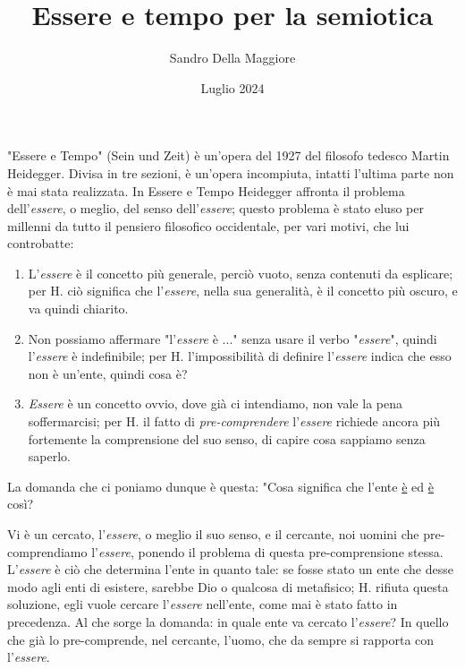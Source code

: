 \documentclass[a4paper,12pt,oneside]{article}%
\begin{document}
	\author{Sandro Della Maggiore}
	\title{Essere e tempo per la semiotica}
	\date{Luglio 2024}
	
	\maketitle


"Essere e Tempo" (Sein und Zeit) è un’opera del 1927 del filosofo tedesco Martin Heidegger. Divisa in tre sezioni, è un’opera incompiuta, intatti l’ultima parte non è mai stata realizzata. In Essere e Tempo Heidegger affronta il problema dell’\textit{essere}, o meglio, del senso dell'\textit{essere}; questo problema è stato eluso per millenni da tutto il pensiero filosofico occidentale, per vari motivi, che lui controbatte:

\begin{enumerate}
	\item L'\textit{essere} è il concetto più generale, perciò vuoto, senza contenuti da esplicare; per H. ciò significa che l'\textit{essere}, nella sua generalità, è il concetto più oscuro, e va quindi chiarito.
	\item Non possiamo affermare "l'\textit{essere} è ..." senza usare il verbo "\textit{essere}", quindi l'\textit{essere} è indefinibile; per H. l'impossibilità di definire l'\textit{essere} indica che esso non è un'ente, quindi cosa è?
	\item \textit{Essere} è un concetto ovvio, dove già ci intendiamo, non vale la pena soffermarcisi; per H. il fatto di \textit{pre-comprendere} l'\textit{essere} richiede ancora più fortemente la comprensione del suo senso, di capire cosa sappiamo senza saperlo.
\end{enumerate}

La domanda che ci poniamo dunque è questa: "Cosa significa che l'ente \underline{è} ed \underline{è} così?

Vi è un cercato, l'\textit{essere}, o meglio il suo senso, e il cercante, noi uomini che pre-comprendiamo l'\textit{essere}, ponendo il problema di questa pre-comprensione stessa. L'\textit{essere} è ciò che determina l'ente in quanto tale: se fosse stato un ente che desse modo agli enti di esistere, sarebbe Dio o qualcosa di metafisico; H. rifiuta questa soluzione, egli vuole cercare l'\textit{essere} nell'ente, come mai è stato fatto in precedenza. Al che sorge la domanda: in quale ente va cercato l'\textit{essere}? In quello che già lo pre-comprende, nel cercante, l'uomo, che da sempre si rapporta con l'\textit{essere}.
\end{document}
